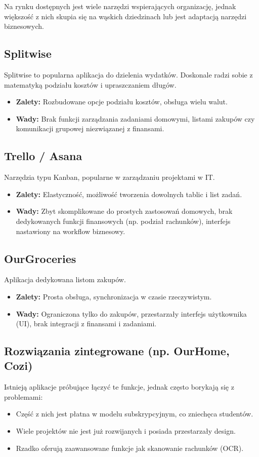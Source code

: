 Na rynku dostępnych jest wiele narzędzi wspierających organizację, jednak większość z nich skupia się na wąskich dziedzinach lub jest adaptacją narzędzi biznesowych.

\subsection{Splitwise}
Splitwise to popularna aplikacja do dzielenia wydatków. Doskonale radzi sobie z matematyką podziału kosztów i upraszczaniem długów.
\begin{itemize}
    \item \textbf{Zalety:} Rozbudowane opcje podziału kosztów, obsługa wielu walut.
    \item \textbf{Wady:} Brak funkcji zarządzania zadaniami domowymi, listami zakupów czy komunikacji grupowej niezwiązanej z finansami.
\end{itemize}

\subsection{Trello / Asana}
Narzędzia typu Kanban, popularne w zarządzaniu projektami w IT.
\begin{itemize}
    \item \textbf{Zalety:} Elastyczność, możliwość tworzenia dowolnych tablic i list zadań.
    \item \textbf{Wady:} Zbyt skomplikowane do prostych zastosowań domowych, brak dedykowanych funkcji finansowych (np. podział rachunków), interfejs nastawiony na workflow biznesowy.
\end{itemize}

\subsection{OurGroceries}
Aplikacja dedykowana listom zakupów.
\begin{itemize}
    \item \textbf{Zalety:} Prosta obsługa, synchronizacja w czasie rzeczywistym.
    \item \textbf{Wady:} Ograniczona tylko do zakupów, przestarzały interfejs użytkownika (UI), brak integracji z finansami i zadaniami.
\end{itemize}

\subsection{Rozwiązania zintegrowane (np. OurHome, Cozi)}
Istnieją aplikacje próbujące łączyć te funkcje, jednak często borykają się z problemami:
\begin{itemize}
    \item Część z nich jest płatna w modelu subskrypcyjnym, co zniechęca studentów.
    \item Wiele projektów nie jest już rozwijanych i posiada przestarzały design.
    \item Rzadko oferują zaawansowane funkcje jak skanowanie rachunków (OCR).
\end{itemize}

